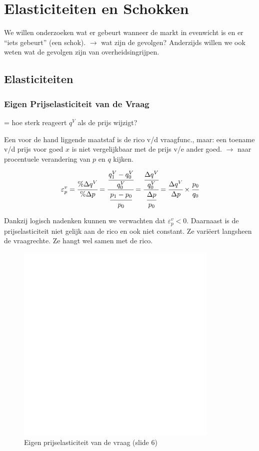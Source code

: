 \section{Elasticiteiten en Schokken}
We willen onderzoeken wat er gebeurt wanneer de markt in evenwicht is en er ``iets gebeurt'' (een schok). $\rightarrow$ wat zijn de gevolgen? Anderzijds willen we ook weten wat de gevolgen zijn van overheidsingrijpen.

\subsection{Elasticiteiten}
\subsubsection{Eigen Prijselasticiteit van de Vraag}
\label{sssec:PrijselastVanDeVraag}

= hoe sterk reageert $q^V$ als de prijs wijzigt?

Een voor de hand liggende maatstaf is de rico v/d vraagfunc., maar: een toename v/d prijs voor goed $x$ is niet vergelijkbaar met de prijs v/e ander goed. $\rightarrow$ naar procentuele verandering van $p$ en $q$ kijken.

\begin{equation}
	\varepsilon^{v}_{p} =
    \cfrac{\% \Delta q^V}{\% \Delta p} =
    \cfrac{\cfrac{q^{V}_{1} - q^{V}_{0}}{q_{0}^{V}}}{\cfrac{p_1 - p_0}{p_0}} =
    \cfrac{\cfrac{\Delta q^V}{q_{0}^{V}}}{\cfrac{\Delta p}{p_0}} =
    \cfrac{\Delta q^V}{\Delta p} \times \cfrac{p_0}{q_0}
    \label{eq:prijselasticiteitvandevraag}
\end{equation}


Dankzij logisch nadenken kunnen we verwachten dat $\varepsilon^{v}_{p} < 0$. Daarnaast is de prijselasticiteit niet gelijk aan de rico en ook niet constant. Ze vari\"{e}ert langsheen de vraagrechte. Ze hangt wel samen met de rico.
\begin{figure}[htbp]
	\centering
	\includegraphics[scale=0.4]{Images/white.png}
	\caption{Eigen prijselasticiteit van de vraag (slide 6)}
	\label{fig:eigenPrijselasticiteitVanDeVraag}
\end{figure}

